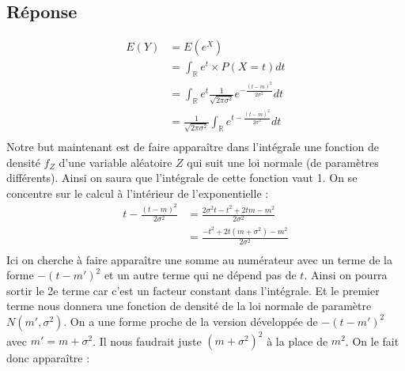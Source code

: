\documentclass[10pt,a4paper,twoside]{article}
\begin{document}
\subsection*{Réponse}
\begin{align*}
E(Y) & = E\left( e^{X} \right)\\
&= \int_{\mathbb{R}} e^{t} \times P(X=t) dt\\
&= \int_{\mathbb{R}} e^{t} \frac{1}{\sqrt{2\pi\sigma^{2}}} e^{-\frac{(t-m)^{2}}{2\sigma^{2}}} dt\\
&= \frac{1}{\sqrt{2\pi\sigma^{2}}} \int_{\mathbb{R}} e^{t-\frac{(t-m)^{2}}{2\sigma^{2}}} dt\\
\end{align*}
Notre but maintenant est de faire apparaître dans l'intégrale une fonction de densité $f_{Z}$ d'une variable aléatoire $Z$ qui suit une loi normale (de paramètres différents). Ainsi on saura que l'intégrale de cette fonction vaut 1. On se concentre sur le calcul à l'intérieur de l'exponentielle :
\begin{align*}
t-\frac{(t-m)^{2}}{2\sigma^{2}} &= \frac{2\sigma^{2}t-t^{2}+2tm-m^{2}}{2\sigma^{2}}\\
&= \frac{-t^{2}+2t(m+\sigma^{2})-m^{2}}{2\sigma^{2}}\\
\end{align*}
Ici on cherche à faire apparaître une somme au numérateur avec un terme de la forme $-(t-m')^{2}$ et un autre terme qui ne dépend pas de $t$. Ainsi on pourra sortir le 2e terme car c'est un facteur constant dans l'intégrale. Et le premier terme nous donnera une fonction de densité de la loi normale de paramètre $N(m',\sigma^{2})$. On a une forme proche de la version développée de $-(t-m')^{2}$ avec $m'=m+\sigma^{2}$. Il nous faudrait juste $(m+\sigma^{2})^{2}$ à la place de $m^{2}$. On le fait donc apparaître :
\end{document}
